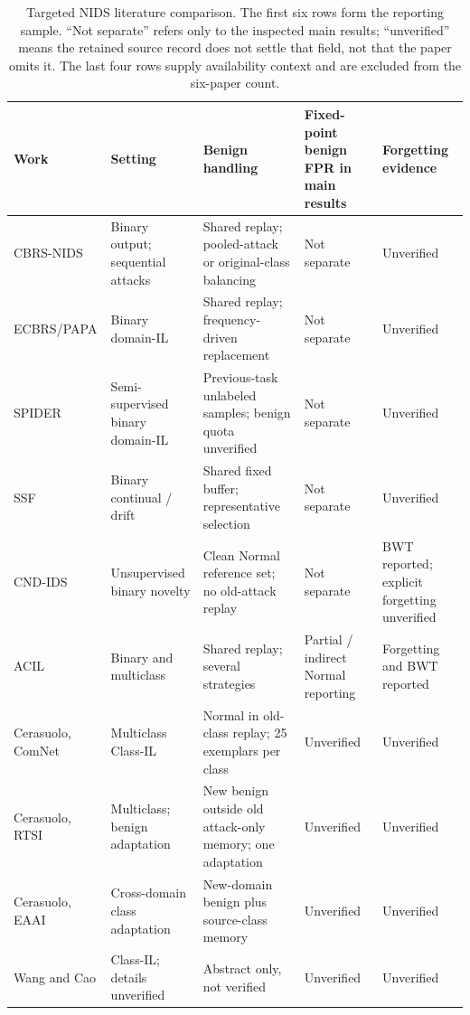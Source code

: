\documentclass[10pt,twocolumn]{article}
\begin{document}
\begin{table}[t]
\centering\small
\caption{Targeted NIDS literature comparison. The first six rows form the reporting sample. ``Not separate'' refers only to the inspected main results; ``unverified'' means the retained source record does not settle that field, not that the paper omits it. The last four rows supply availability context and are excluded from the six-paper count.}\label{tab:literature-nids}
\setlength{\tabcolsep}{4pt}
\begin{tabular}{@{}p{}p{}p{}p{}p{}@{}}
\toprule
Work & Setting & Benign handling & Fixed-point benign FPR in main results & Forgetting evidence \\
\midrule
CBRS-NIDS \citep{cbrs} & Binary output; sequential attacks & Shared replay; pooled-attack or original-class balancing & Not separate & Unverified \\
ECBRS/PAPA \citep{ecbrs} & Binary domain-IL & Shared replay; frequency-driven replacement & Not separate & Unverified \\
SPIDER \citep{spider} & Semi-supervised binary domain-IL & Previous-task unlabeled samples; benign quota unverified & Not separate & Unverified \\
SSF \citep{ssf} & Binary continual / drift & Shared fixed buffer; representative selection & Not separate & Unverified \\
CND-IDS \citep{cndids} & Unsupervised binary novelty & Clean Normal reference set; no old-attack replay & Not separate & BWT reported; explicit forgetting unverified \\
ACIL \citep{acil} & Binary and multiclass & Shared replay; several strategies & Partial / indirect Normal reporting & Forgetting and BWT reported \\
\midrule
Cerasuolo, ComNet \citep{cerasuolo_comnet} & Multiclass Class-IL & Normal in old-class replay; 25 exemplars per class & Unverified & Unverified \\
Cerasuolo, RTSI \citep{cerasuolo_rtsi} & Multiclass; benign adaptation & New benign outside old attack-only memory; one adaptation & Unverified & Unverified \\
Cerasuolo, EAAI \citep{cerasuolo_eaai} & Cross-domain class adaptation & New-domain benign plus source-class memory & Unverified & Unverified \\
Wang and Cao \citep{wangcao} & Class-IL; details unverified & Abstract only, not verified & Unverified & Unverified \\
\bottomrule
\end{tabular}
\end{table}
\end{document}
